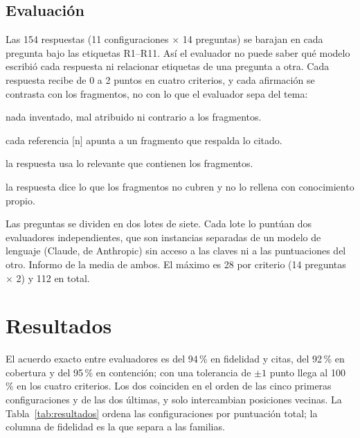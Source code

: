 \documentclass{article}
\begin{document}
\subsection{Evaluación}

Las 154 respuestas (11 configuraciones $\times$ 14 preguntas) se barajan en
cada pregunta bajo las etiquetas R1--R11. Así el evaluador no puede saber
qué modelo escribió cada respuesta ni relacionar etiquetas de una pregunta a
otra. Cada respuesta recibe de 0 a 2 puntos en cuatro criterios, y cada
afirmación se contrasta con los fragmentos, no con lo que el evaluador sepa
del tema:

\begin{description}\setlength{\itemsep}{1pt}\setlength{\parskip}{0pt}
  \item[Fidelidad:] nada inventado, mal atribuido ni contrario a los fragmentos.
  \item[Citas:] cada referencia [n] apunta a un fragmento que respalda lo citado.
  \item[Cobertura:] la respuesta usa lo relevante que contienen los fragmentos.
  \item[Contención:] la respuesta dice lo que los fragmentos no cubren y no
  lo rellena con conocimiento propio.
\end{description}

Las preguntas se dividen en dos lotes de siete. Cada lote lo puntúan dos
evaluadores independientes, que son instancias separadas de un modelo de
lenguaje (Claude, de Anthropic) sin acceso a las claves ni a las
puntuaciones del otro. Informo de la media de ambos. El máximo es 28 por
criterio (14 preguntas $\times$ 2) y 112 en total.

\section{Resultados}

El acuerdo exacto entre evaluadores es del 94\,\% en fidelidad y citas, del
92\,\% en cobertura y del 95\,\% en contención; con una tolerancia de
$\pm 1$ punto llega al 100\,\% en los cuatro criterios. Los dos coinciden en
el orden de las cinco primeras configuraciones y de las dos últimas, y solo
intercambian posiciones vecinas. La Tabla~\ref{tab:resultados} ordena las
configuraciones por puntuación total; la columna de fidelidad es la que
separa a las familias.
\end{document}
